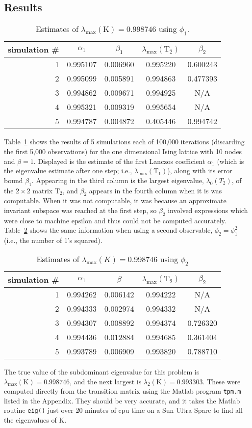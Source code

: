 \documentclass[12pt,letterpaper]{report}
\theoremstyle{plain}
\theoremstyle{definition}
\theoremstyle{remark}
\numberwithin{theorem}{chapter}
\numberwithin{claim}{chapter}
\numberwithin{equation}{chapter}
\numberwithin{conjecture}{chapter}
\newcommand\T{\ensuremath{\mathrm{T}}}
\newcommand\K{\ensuremath{\mathrm{K}}}
\newcommand\<{\ensuremath{\langle}}
\renewcommand\>{\ensuremath{\rangle}}
\begin{document}
\subsection{Results}
\begin{table}
\centering
\label{tab:1}
\caption{Estimates of $\lambda_{\max}(\K) = 0.998746$ using $\phi_1$.}
\vskip4mm
\begin{tabular}{r|c|c|c|c}
simulation \# & $\alpha_1$ & $\beta_1$ & $\lambda_{\max}(\T_2)$& $\beta_2$\\
\hline
1& 0.995107& 0.006960& 0.995220& 0.600243\\
2& 0.995099& 0.005891& 0.994863& 0.477393\\
3& 0.994862& 0.009671& 0.994925& N/A\\
4& 0.995321& 0.009319& 0.995654& N/A\\
5& 0.994787& 0.004872& 0.405446& 0.994742
\end{tabular}
\end{table}
Table~\ref{tab:1} shows the results of 5 simulations each of 100,000 iterations (discarding the first
5,000 observations) for the one dimensional Ising lattice with 10 nodes and $\beta= 1$. Displayed is
the estimate of the first Lanczos coefficient $\alpha_1$ (which is the
eigenvalue estimate after one step; i.e., $\lambda_{\max}(\T_1)$), along with its
error bound $\beta_1$. Appearing in the third column is the largest eigenvalue,
$\lambda_0(T_2)$, of the $2 \times 2$ matrix $\T_2$, and $\beta_2$ appears in the
fourth column when it is was computable. When it was not computable, it was
because an approximate invariant subspace was reached 
at the first step, so $\beta_2$ involved expressions which were close to machine
epsilon and thus could not be computed accurately. Table~\ref{tab:2}  shows the same
information when using a second observable, 
$\phi_2 = \phi_1^2$ (i.e., the number of 1's squared).

\begin{table}
\centering
\label{tab:2}
\caption{Estimates of $\lambda_{\max}(K) = 0.998746$ using $\phi_2$}
\vskip4mm
\begin{tabular}{r|c|c|c|c}
simulation \# & $\alpha_1$ & $\beta$ & $\lambda_{\max}(\T_2)$& $\beta_2$\\
\hline
1& 0.994262& 0.006142& 0.994222& N/A\\
2& 0.994333& 0.002974& 0.994332& N/A\\
3& 0.994307& 0.008892& 0.994374& 0.726320\\
4& 0.994436& 0.012884& 0.994685& 0.361404\\
5& 0.993789& 0.006909& 0.993820& 0.788710
\end{tabular}
\end{table}
The true value of the subdominant eigenvalue for this problem is $\lambda_{\max}(\K) = 0.998746$,
and the next largest is $\lambda_2(\K) = 0.993303$. These were computed directly
from the transition matrix 
%
%
%
%
using the Matlab program {\tt tpm.m} listed in the Appendix. They should be very accurate, and it
takes the Matlab routine {\tt eig()} just over 20 minutes of cpu time on a Sun
Ultra Sparc to find all the eigenvalues of K.
\end{document}
